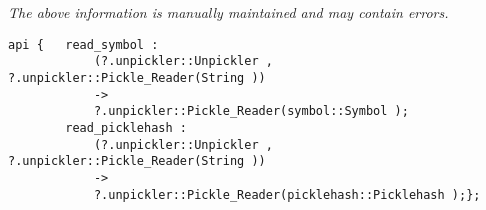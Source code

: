 \label{api:Symbol\_And\_Picklehash\_Unpickling}

{\tiny \it The above information is manually maintained and may contain errors.}
\begin{verbatim}
api {   read_symbol :
            (?.unpickler::Unpickler , ?.unpickler::Pickle_Reader(String ))
            ->
            ?.unpickler::Pickle_Reader(symbol::Symbol );
        read_picklehash :
            (?.unpickler::Unpickler , ?.unpickler::Pickle_Reader(String ))
            ->
            ?.unpickler::Pickle_Reader(picklehash::Picklehash );};
\end{verbatim}
